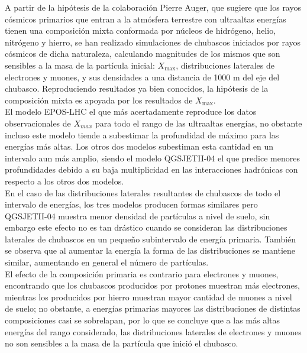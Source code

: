 
A partir de la hipótesis de la colaboración Pierre Auger, que sugiere que los rayos cósmicos primarios que entran a la atmósfera terrestre con ultraaltas energías tienen una composición mixta conformada por núcleos de hidrógeno, helio, nitrógeno y hierro, se han realizado simulaciones de chubascos iniciados por rayos cósmicos de dicha naturaleza, calculando magnitudes de los mismos que son sensibles a la masa de la partícula inicial: $X_{\text{max}}$, distribuciones laterales de electrones y muones, y sus densidades a una distancia de 1000 m del eje del chubasco. Reproduciendo resultados ya bien conocidos, la hipótesis de la composición mixta es apoyada por los resultados de $X_{\text{max}}$. \\

El modelo EPOS-LHC el que más acertadamente reproduce los datos observacionales de $X_{max}$ para todo el rango de las ultraaltas energías, no obstante incluso este modelo tiende a subestimar la profundidad de máximo para las energías más altas. Los otros dos modelos subestiman esta cantidad en un intervalo aun más amplio, siendo el modelo QGSJETII-04 el que predice menores profundidades debido a su baja multiplicidad en las interacciones hadrónicas con respecto a los otros dos modelos. \\

En el caso de las distribuciones laterales resultantes de chubascos de todo el intervalo de energías, los tres modelos producen formas similares pero QGSJETII-04 muestra menor densidad de partículas a nivel de suelo, sin embargo este efecto no es tan drástico cuando se consideran las distribuciones laterales de chubascos en un pequeño subintervalo de energía primaria. También se observa que al aumentar la energía la forma de las distribuciones se mantiene similar, aumentando en general el número de partículas. \\

El efecto de la composición primaria es contrario para electrones y muones, encontrando que los chubascos producidos por protones muestran más electrones, mientras los producidos por hierro muestran mayor cantidad de muones a nivel de suelo; no obstante, a energías primarias mayores las distribuciones de distintas composiciones casi se sobrelapan, por lo que se concluye que a las más altas energías del rango considerado, las distribuciones laterales de electrones y muones no son sensibles a la masa  de la partícula que inició el chubasco. \\

